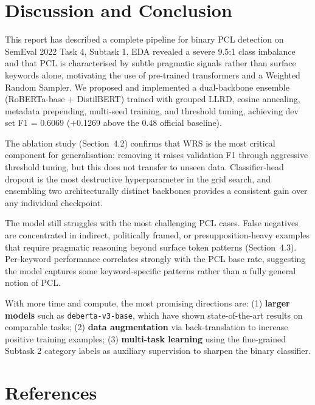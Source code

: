 \documentclass[11pt]{article}
\begin{document}
\clearpage
\section{Discussion and Conclusion}
\label{sec:discussion}

This report has described a complete pipeline for binary PCL detection on SemEval 2022 Task 4, Subtask 1. EDA revealed a severe 9.5:1 class imbalance and that PCL is characterised by subtle pragmatic signals rather than surface keywords alone, motivating the use of pre-trained transformers and a Weighted Random Sampler. We proposed and implemented a dual-backbone ensemble (RoBERTa-base + DistilBERT) trained with grouped LLRD, cosine annealing, metadata prepending, multi-seed training, and threshold tuning, achieving dev set F1 = 0.6069 ($+$0.1269 above the 0.48 official baseline).

The ablation study (Section~4.2) confirms that WRS is the most critical component for generalisation: removing it raises validation F1 through aggressive threshold tuning, but this does not transfer to unseen data. Classifier-head dropout is the most destructive hyperparameter in the grid search, and ensembling two architecturally distinct backbones provides a consistent gain over any individual checkpoint.

The model still struggles with the most challenging PCL cases. False negatives are concentrated in indirect, politically framed, or presupposition-heavy examples that require pragmatic reasoning beyond surface token patterns (Section~4.3). Per-keyword performance correlates strongly with the PCL base rate, suggesting the model captures some keyword-specific patterns rather than a fully general notion of PCL.

With more time and compute, the most promising directions are: (1) \textbf{larger models} such as \texttt{deberta-v3-base}, which have shown state-of-the-art results on comparable tasks; (2) \textbf{data augmentation} via back-translation to increase positive training examples; (3) \textbf{multi-task learning} using the fine-grained Subtask 2 category labels as auxiliary supervision to sharpen the binary classifier.

\clearpage
\section*{References}
\end{document}
